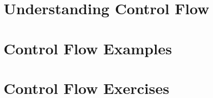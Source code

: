 \clearpage
\def\pageLang{None}
\section{Understanding Control Flow} %
\label{sec:understanding_control_flow}




\clearpage
\section{Control Flow Examples} %
\label{sec:control_flow_examples}




\clearpage
\section{Control Flow Exercises} %
\label{sec:control_flow_exercises}






